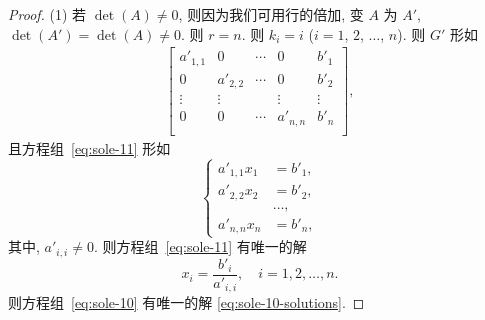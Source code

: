 \documentclass[../libro.tex]{subfiles}
\begin{document}
\begin{proof}
    (1)
    若 \(\det {(A)} \neq 0\),
    则因为我们可用行的倍加,
    变 \(A\) 为 \(A'\),
    \(\det {(A')} = \det {(A)} \neq 0\).
    则 \(r = n\).
    则 \(k_i = i\) (\(i = 1\), \(2\), \(\dots\), \(n\)).
    则 \(G'\) 形如
    \begin{align*}
        \begin{bmatrix}
            a'_{1,1} & 0        & \cdots & 0        & b'_1   \\
            0        & a'_{2,2} & \cdots & 0        & b'_2   \\
            \vdots   & \vdots   & {}     & \vdots   & \vdots \\
            0        & 0        & \cdots & a'_{n,n} & b'_n   \\
        \end{bmatrix},
    \end{align*}
    且方程组~\eqref{eq:sole-11} 形如
    \begin{equation*}
        \left\{ %
        \begin{aligned}
            a'_{1,1} x_1 & = b'_1, \\
            a'_{2,2} x_2 & = b'_2, \\
            & \dots, \\
            a'_{n,n} x_n & = b'_n,
        \end{aligned}
        \right. %
    \end{equation*}
    其中, \(a'_{i,i} \neq 0\).
    则方程组~\eqref{eq:sole-11} 有唯一的解
    \begin{equation}
        x_i = \frac{b'_i}{a'_{i,i}},
        \quad i = 1, 2, \dots, n.
        \label{eq:sole-10-solutions}
    \end{equation}
    则方程组~\eqref{eq:sole-10} 有唯一的解
    \eqref{eq:sole-10-solutions}.


\end{proof}
\end{document}
